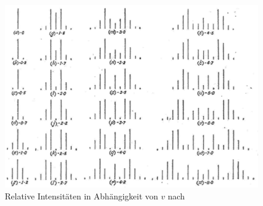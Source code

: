 \begin{figure}
 \centering \includegraphics{Bilder/bessel-funktionen.jpg}
 \caption{Relative Intensitäten in Abhängigkeit von $v$ nach \cite{Raman}}
\end{figure}

